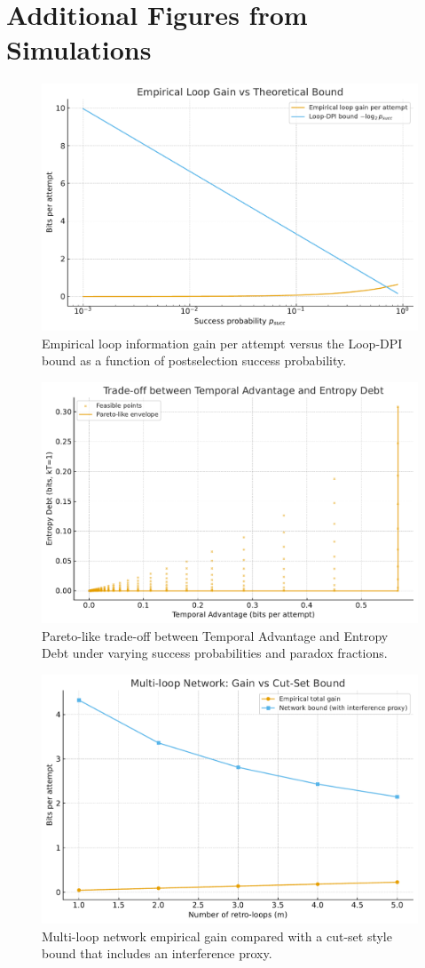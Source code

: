 
\section{Additional Figures from Simulations}
\begin{figure}[h]
\centering
\includegraphics[width=0.7\linewidth]{figures/empirical_vs_bound.pdf}
\caption{Empirical loop information gain per attempt versus the Loop-DPI bound as a function of postselection success probability.}
\end{figure}

\begin{figure}[h]
\centering
\includegraphics[width=0.7\linewidth]{figures/pareto_frontier.pdf}
\caption{Pareto-like trade-off between Temporal Advantage and Entropy Debt under varying success probabilities and paradox fractions.}
\end{figure}

\begin{figure}[h]
\centering
\includegraphics[width=0.7\linewidth]{figures/multiloop_gain.pdf}
\caption{Multi-loop network empirical gain compared with a cut-set style bound that includes an interference proxy.}
\end{figure}

